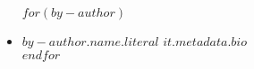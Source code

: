 \begin{itemize}
    $for(by-author)$
    \item[] \textbf{\textsf{$by-author.name.literal$}}
    \textsf{$it.metadata.bio$} \\
    $endfor$
\end{itemize}